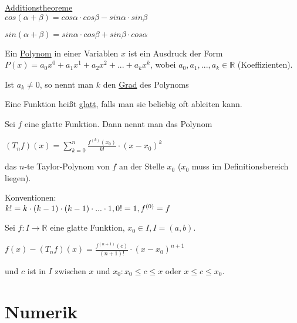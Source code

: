 \documentclass{mg2}
\begin{document}
\underline{Additionstheoreme}\\[1em]
$cos(\alpha + \beta) = cos\alpha \cdot cos \beta - sin \alpha \cdot sin \beta$

$sin(\alpha + \beta) = sin \alpha \cdot cos \beta + sin \beta \cdot cos \alpha$

\begin{definition}[Polynom]
Ein \underline{Polynom} in einer Variablen $x$ ist ein Ausdruck der Form $P(x) = a_0 x^0 + a_1 x^1 + a_2 x^2 + ... + a_k x^k$, wobei $a_0,a_1,...,a_k \in \mathbb{R}$ (Koeffizienten).

Ist $a_k \neq 0$, so nennt man $k$ den \underline{Grad} des Polynoms
\end{definition}

\begin{definition}
Eine Funktion heißt \underline{glatt}, falls man sie beliebig oft ableiten kann.
\end{definition}

\begin{definition}
Sei $f$ eine glatte Funktion. Dann nennt man das Polynom 

$(T_n f)(x) = \sum\nolimits_{k=0}^n \frac{f^{(k)} (x_0)}{k!} \cdot (x-x_0)^k$ 

das $n$-te Taylor-Polynom von $f$ an der Stelle $x_0$ ($x_0$ muss im Definitionsbereich liegen).

Konventionen:\\
 $k! = k\cdot(k-1)\cdot(k-1)\cdot... \cdot 1,\\
  0! = 1,\\
   f^{(0)} = f$
\end{definition}

\begin{satz}
Sei $f: I \to \mathbb{R}$ eine glatte Funktion, $x_0 \in I, I = (a,b)$.

$f(x) - (T_n f)(x) = \frac{f^{(n+1)}(c)}{(n+1)!} \cdot (x-x_0)^{n+1}$

und $c$ ist in $I$ zwischen $x$ und $x_0: x_0 \leq c \leq x$ oder $x \leq c \leq x_0$.
\end{satz}
\section{Numerik}
\end{document}
